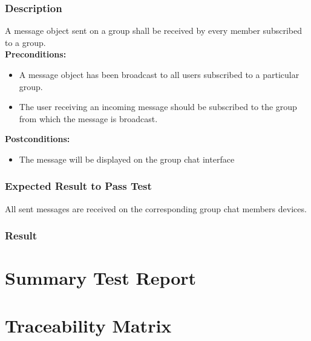 \documentclass[11pt]{article}
\begin{document}
\subsubsection{Description}
A message object sent on a group shall be received
by every member subscribed to a group.\\
\textbf{Preconditions:} 
\begin{itemize}
\item A message object has been broadcast to all users subscribed to a particular group.
\item The user receiving an incoming message should be subscribed to the
group from which the message is broadcast.
\end{itemize}
\textbf{Postconditions:}
\begin{itemize}
\item The message will be displayed on the group chat interface
\end{itemize}
\subsubsection{Expected Result to Pass Test}
All sent messages are received on the corresponding group chat members devices.
\subsubsection{Result}

\section{Summary Test Report}

\section{Traceability Matrix}
\end{document}
